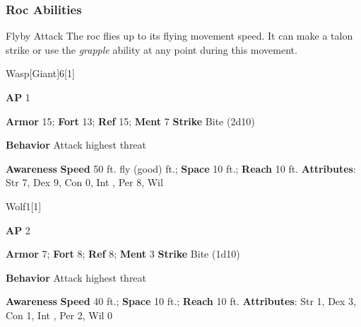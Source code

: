 \subsubsection{Roc Abilities}

\begin{ability}{Flyby Attack}
The roc flies up to its flying movement speed.
It can make a talon strike or use the \textit{grapple} ability at any point during this movement.
\end{ability}

\begin{monsection}{Wasp}[Giant]{6}[1]
\vspace{-1em}\vspace{-1em}
\begin{spellcontent}
\begin{spelltargetinginfo}
{\textbf{AP} 1}

\pari \textbf{Armor} 15;
\textbf{Fort} 13;
\textbf{Ref} 15;
\textbf{Ment} 7
\pari \textbf{Strike} Bite  (2d10)



\pari \textbf{Behavior} Attack highest threat
\end{spelltargetinginfo}
\end{spellcontent}

\begin{monsterfooter}
\pari \textbf{Awareness} 
\pari \textbf{Speed} 50 ft. fly (good) ft.;
\textbf{Space} 10 ft.;
\textbf{Reach} 10 ft.
\pari \textbf{Attributes}:
Str 7,
Dex 9,
Con 0,
Int ,
Per 8,
Wil 
\end{monsterfooter}
\end{monsection}

\begin{monsection}{Wolf}{1}[1]
\vspace{-1em}\vspace{-1em}
\begin{spellcontent}
\begin{spelltargetinginfo}
{\textbf{AP} 2}

\pari \textbf{Armor} 7;
\textbf{Fort} 8;
\textbf{Ref} 8;
\textbf{Ment} 3
\pari \textbf{Strike} Bite  (1d10)



\pari \textbf{Behavior} Attack highest threat
\end{spelltargetinginfo}
\end{spellcontent}

\begin{monsterfooter}
\pari \textbf{Awareness} 
\pari \textbf{Speed} 40 ft.;
\textbf{Space} 10 ft.;
\textbf{Reach} 10 ft.
\pari \textbf{Attributes}:
Str 1,
Dex 3,
Con 1,
Int ,
Per 2,
Wil 0
\end{monsterfooter}
\end{monsection}


